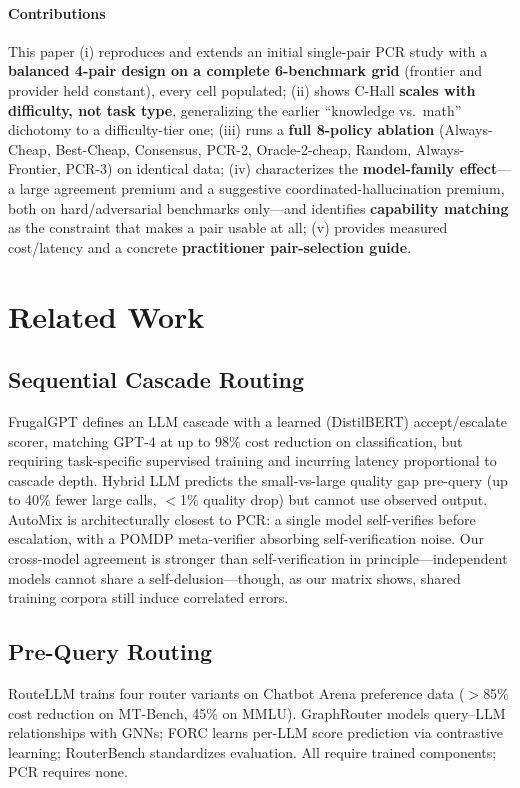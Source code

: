 \documentclass[conference]{IEEEtran}
\begin{document}
\paragraph{Contributions} This paper (i) reproduces and extends an initial
single-pair PCR study with a \textbf{balanced 4-pair design on a complete
6-benchmark grid} (frontier and provider held constant), every cell populated; (ii) shows C-Hall \textbf{scales with difficulty, not task type},
generalizing the earlier ``knowledge vs.\ math'' dichotomy to a difficulty-tier
one; (iii) runs a \textbf{full 8-policy ablation} (Always-Cheap, Best-Cheap,
Consensus, PCR-2, Oracle-2-cheap, Random, Always-Frontier, PCR-3) on identical
data; (iv) characterizes the \textbf{model-family effect}---a large agreement
premium and a suggestive coordinated-hallucination premium, both on
hard/adversarial benchmarks only---and identifies \textbf{capability matching} as
the constraint that makes a pair usable at all; (v) provides measured
cost/latency and a concrete
\textbf{practitioner pair-selection guide}.

\section{Related Work}

\subsection{Sequential Cascade Routing}
FrugalGPT \cite{chen2023frugalgpt} defines an LLM cascade with a learned
(DistilBERT) accept/escalate scorer, matching GPT-4 at up to 98\% cost reduction
on classification, but requiring task-specific supervised training and incurring
latency proportional to cascade depth. Hybrid LLM \cite{ding2024hybrid} predicts
the small-vs-large quality gap pre-query (up to 40\% fewer large calls,
$<$1\% quality drop) but cannot use observed output. AutoMix
\cite{aggarwal2024automix} is architecturally closest to PCR: a single model
self-verifies before escalation, with a POMDP meta-verifier absorbing
self-verification noise. Our cross-model agreement is stronger than
self-verification in principle---independent models cannot share a
self-delusion---though, as our matrix shows, shared training corpora still
induce correlated errors.

\subsection{Pre-Query Routing}
RouteLLM \cite{ong2024routellm} trains four router variants on Chatbot Arena
preference data ($>$85\% cost reduction on MT-Bench, 45\% on MMLU). GraphRouter
\cite{feng2024graphrouter} models query--LLM relationships with GNNs; FORC
\cite{sakota2024forc} learns per-LLM score prediction via contrastive learning;
RouterBench \cite{hu2024routerbench} standardizes evaluation. All require trained
components; PCR requires none.
\end{document}
